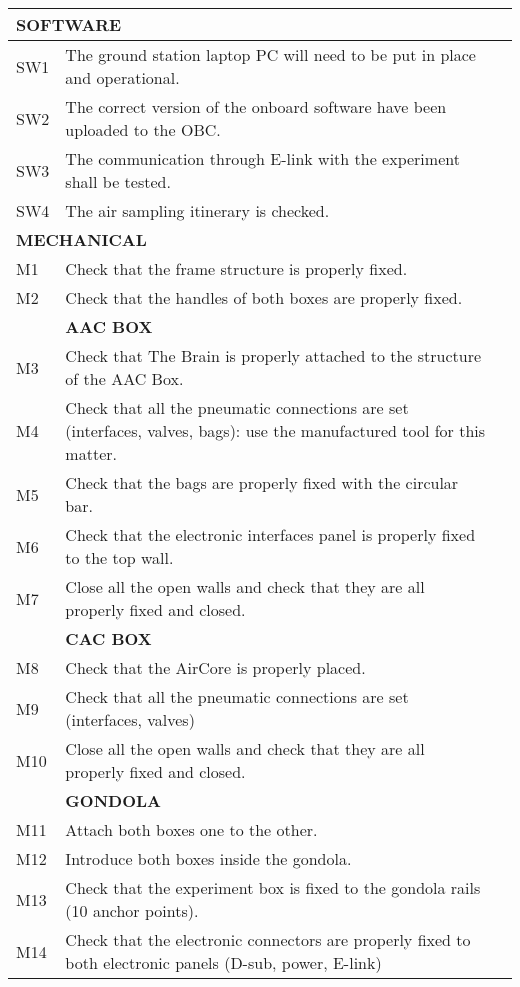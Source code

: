 \begin{longtable} {|m{}|m{}|m{}|}
\hline
\multicolumn{2}{|l|}{ \textbf{SOFTWARE} } & \\
\hline
SW1 & The ground station laptop PC will need to be put in place and operational. & \\
\hline
SW2 & The correct version of the onboard software have been uploaded to the OBC. & \\
\hline
SW3 & The communication through E-link with the experiment shall be tested. & \\
\hline
SW4 & The air sampling itinerary is checked. & \\
\hline
\multicolumn{2}{|l|}{ \textbf{MECHANICAL} } & \\
\hline
M1 & Check that the frame structure is properly fixed. & \\
\hline
M2 & Check that the handles of both boxes are properly fixed. & \\
\hline
& \textbf{AAC BOX} & \\
\hline
M3 & Check that The Brain is properly attached to the structure of the AAC Box. & \\
\hline
M4 & Check that all the pneumatic connections are set (interfaces, valves, bags): use the manufactured tool for this matter. & \\
\hline
M5 & Check that the bags are properly fixed with the circular bar. & \\
\hline
M6 & Check that the electronic interfaces panel is properly fixed to the top wall. & \\
\hline
M7 & Close all the open walls and check that they are all properly fixed and closed. & \\
\hline
& \textbf{CAC BOX} & \\
\hline
M8 & Check that the AirCore is properly placed. & \\
\hline
M9 & Check that all the pneumatic connections are set (interfaces, valves) & \\
\hline
M10 & Close all the open walls and check that they are all properly fixed and closed. & \\
\hline
& \textbf{GONDOLA} & \\
\hline
M11 &  Attach both boxes one to the other. & \\
\hline
M12 & Introduce both boxes inside the gondola. & \\
\hline
M13 & Check that the experiment box is fixed to the gondola rails (10 anchor points). & \\
\hline
M14 & Check that the electronic connectors are properly fixed to both electronic panels (D-sub, power, E-link) & \\
\hline

\end{longtable}
